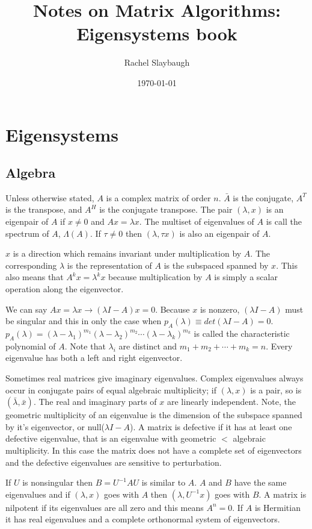 \documentclass[12pt,twoside]{article}
\date{\today}
\title{Notes on Matrix Algorithms: Eigensystems book}
\author{Rachel Slaybaugh}
\newcommand{\evall}{eigenvalue}
\newcommand{\evalsl}{eigenvalues}
\newcommand{\evecc}{eigenvector}
\newcommand{\evecsc}{eigenvectors}
\newcommand{\eval}{eigenvalue }
\newcommand{\evals}{eigenvalues }
\newcommand{\evecs}{eigenvectors }
\begin{document}
\maketitle
\section{Eigensystems}
\subsection{Algebra}
Unless otherwise stated, $A$ is a complex matrix of order $n$. $\bar{A}$ is the conjugate, $A^{T}$ is the transpose, and $A^{H}$ is the conjugate transpose. The pair $(\lambda, x)$ is an eigenpair of $A$ if $x \ne 0$ and $Ax = \lambda x$. The multiset of eigenvalues of $A$ is call the spectrum of $A$, $\Lambda(A)$. If $\tau \ne 0$ then $(\lambda, \tau x)$ is also an eigenpair of $A$.

$x$ is a direction which remains invariant under multiplication by $A$. The corresponding $\lambda$ is the representation of $A$ is the subspaced spanned by $x$. This also means that $A^{k}x = \lambda^{k}x$ because multiplication by $A$ is simply a scalar operation along the eigenvector. 

We can say $Ax=\lambda x \to (\lambda I - A)x = 0$. Because $x$ is nonzero, $(\lambda I - A)$ must be singular and this in only the case when $p_{A}(\lambda) \equiv det(\lambda I - A) = 0$. $p_{A}(\lambda) = (\lambda - \lambda_{1})^{m_{1}} (\lambda - \lambda_{2})^{m_{2}}\cdots (\lambda - \lambda_{k})^{m_{k}} $ is called the characteristic polynomial of $A$. Note that $\lambda_{i}$ are distinct and $m_{1} + m_{2} + \cdots + m_{k} = n$. Every eigenvalue has both a left and right eigenvector. 

Sometimes real matrices give imaginary \evalsl. Complex \evals always occur in conjugate pairs of equal algebraic multiplicity; if $(\lambda, x)$ is a pair, so is $(\bar{\lambda}, \bar{x})$. The real and imaginary parts of $x$ are linearly independent. Note, the geometric multiplicity of an \eval is the dimension of the subspace spanned by it's \evecc, or null($\lambda I - A$). A matrix is defective if it has at least one defective \evall, that is an \eval with geometric $<$ algebraic multiplicity. In this case the matrix does not have a complete set of \evecs and the defective \evals are sensitive to perturbation. 

If $U$ is nonsingular then $B = U^{-1}AU$ is similar to $A$. $A$ and $B$ have the same eigenvalues and if $(\lambda, x)$ goes with $A$ then $(\lambda, U^{-1}x)$ goes with $B$. A matrix is nilpotent if its \evals are all zero and this means $A^n = 0$. If $A$ is Hermitian it has real \evals and a complete orthonormal system of \evecsc. 
\end{document}
